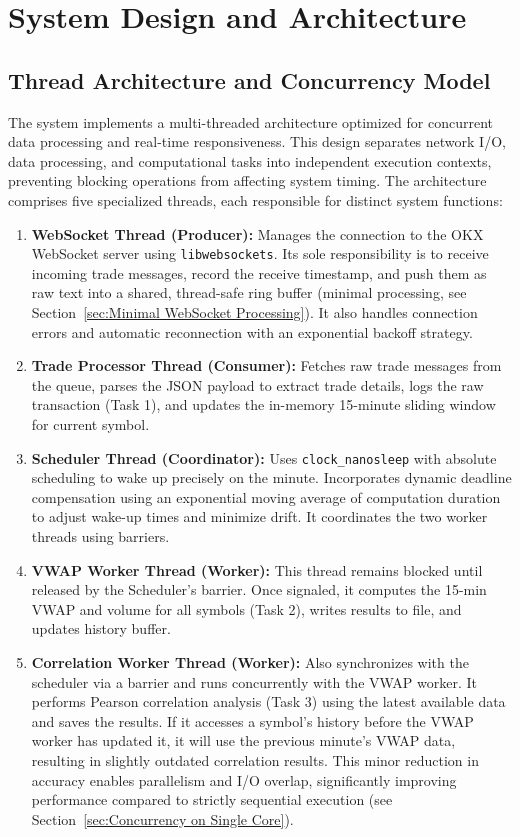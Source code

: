 \documentclass[12pt,a4paper]{article}
\begin{document}
\section{System Design and Architecture}

\subsection{Thread Architecture and Concurrency Model}

The system implements a multi-threaded architecture optimized for concurrent data processing and real-time responsiveness. This design separates network I/O, data processing, and computational tasks into independent execution contexts, preventing blocking operations from affecting system timing. The architecture comprises five specialized threads, each responsible for distinct system functions:

\begin{enumerate}
    \item \textbf{WebSocket Thread (Producer):} Manages the connection to the OKX WebSocket server using \texttt{libwebsockets}. Its sole responsibility is to receive incoming trade messages, record the receive timestamp, and push them as raw text into a shared, thread-safe ring buffer (minimal processing, see Section~\ref{sec:Minimal WebSocket Processing}). It also handles connection errors and automatic reconnection with an exponential backoff strategy.
    \item \textbf{Trade Processor Thread (Consumer):} Fetches raw trade messages from the queue, parses the JSON payload to extract trade details, logs the raw transaction (Task 1), and updates the in-memory 15-minute sliding window for current symbol.
    \item \textbf{Scheduler Thread (Coordinator):} Uses \texttt{clock\_nanosleep} with absolute scheduling  to wake up precisely on the minute. Incorporates dynamic deadline compensation using an exponential moving average of computation duration to adjust wake-up times and minimize drift. It coordinates the two worker threads using barriers.
    \item \textbf{VWAP Worker Thread (Worker):} This thread remains blocked until released by the Scheduler's barrier. Once signaled, it computes the 15-min VWAP and volume for all symbols (Task 2), writes results to file, and updates history buffer.   
    \item \textbf{Correlation Worker Thread (Worker):} Also synchronizes with the scheduler via a barrier and runs concurrently with the VWAP worker. It performs Pearson correlation analysis (Task 3) using the latest available data and saves the results. If it accesses a symbol's history before the VWAP worker has updated it, it will use the previous minute's VWAP data, resulting in slightly outdated correlation results. This minor reduction in accuracy enables parallelism and I/O overlap, significantly improving performance compared to strictly sequential execution (see Section~\ref{sec:Concurrency on Single Core}).
    
\end{enumerate}
\end{document}
